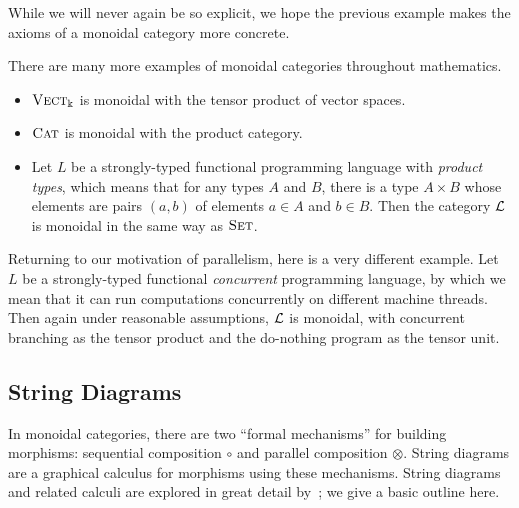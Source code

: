 While we will never again be so explicit, we hope the previous example makes the
axioms of a monoidal category more concrete.

\begin{ex}
  There are many more examples of monoidal categories throughout mathematics.
  \begin{itemize}
    \item ${\textsc{\text{Vect}}}_\Bbbk$ is monoidal with the tensor product of vector spaces.
    \item ${\textsc{\text{Cat}}}$ is monoidal with the product category.
    \item Let $L$ be a strongly-typed functional programming language with
      \emph{product types}, which means that for any types $A$ and $B$, there is
      a type $A\times B$ whose elements are pairs $(a, b)$ of elements $a\in A$
      and $b\in B$. Then the category $\mathcal{L}$ is monoidal in the same way as
      ${\textsc{\text{Set}}}$.
  \end{itemize}
\end{ex}

\begin{ex}
  Returning to our motivation of parallelism, here is a very different example.
  Let $L$ be a strongly-typed functional \emph{concurrent} programming language,
  by which we mean that it can run computations concurrently on different
  machine threads. Then again under reasonable assumptions, $\mathcal{L}$ is monoidal,
  with concurrent branching as the tensor product and the do-nothing program as
  the tensor unit.
\end{ex}

\subsection{String Diagrams}
\label{sec:string diagrams}

In monoidal categories, there are two ``formal mechanisms'' for building
morphisms: sequential composition $\circ$ and parallel composition $\otimes$.
String diagrams are a graphical calculus for morphisms using these mechanisms.
String diagrams and related calculi are explored in great detail
by~\cite{selinger-2011}; we give a basic outline here.


